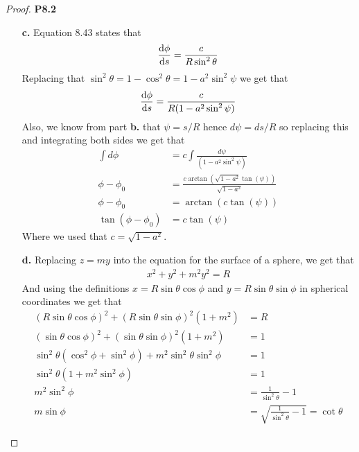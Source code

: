 \documentclass[11pt]{article}
\theoremstyle{definition}
\begin{document}
\begin{proof}{\textbf{P8.2}}
\begin{itemize}
        \item [\textbf{c.}]
        Equation 8.43 states that
        \begin{align*}
            \derivative{\phi}{s} = \frac{c}{R\sin^2\theta}
        \end{align*}
        Replacing that $\sin^2\theta = 1 - \cos^2\theta = 1 - a^2\sin^2\psi$
        we get that
        \begin{align*}
            \derivative{\phi}{s} = \frac{c}{R(1 - a^2 \sin^2\psi)}
        \end{align*}
        Also, we know from part \textbf{b.} that $\psi = s/R$ hence $d\psi = ds/R$ so replacing this and integrating both sides we get that
        \begin{align*}
            \int d\phi &= c\int \frac{d\psi}{(1 - a^2 \sin^2\psi)}\\
            \phi - \phi_0 &= \frac{c\arctan(\sqrt{1 - a^2} \tan(\psi))}{\sqrt{1 - a^2}}\\
            \phi - \phi_0 &= \arctan(c \tan(\psi))\\
            \tan(\phi - \phi_0) &= c \tan(\psi)
        \end{align*}
        Where we used that $c = \sqrt{1 - a^2}$.

        \item [\textbf{d.}] Replacing $z = my$ into the equation for the
        surface of a sphere, we get that
        \begin{align*}
            x^2 + y^2 + m^2y^2 = R
        \end{align*}
        And using the definitions $x = R\sin\theta\cos\phi$ and
        $y=R\sin\theta\sin\phi$ in spherical coordinates we get that
        \begin{align*}
            (R\sin\theta\cos\phi)^2 + (R\sin\theta\sin\phi)^2(1 + m^2) &= R\\
            (\sin\theta\cos\phi)^2 + (\sin\theta\sin\phi)^2(1 + m^2) &= 1\\
            \sin^2\theta(\cos^2\phi + \sin^2\phi) + m^2\sin^2\theta\sin^2\phi &= 1\\
            \sin^2\theta(1 + m^2\sin^2\phi) &= 1\\
            m^2\sin^2\phi &= \frac{1}{\sin^2\theta} -1\\
            m\sin\phi &= \sqrt{\frac{1}{\sin^2\theta} -1} = \cot\theta
        \end{align*}


\end{itemize}
\end{proof}
\end{document}
